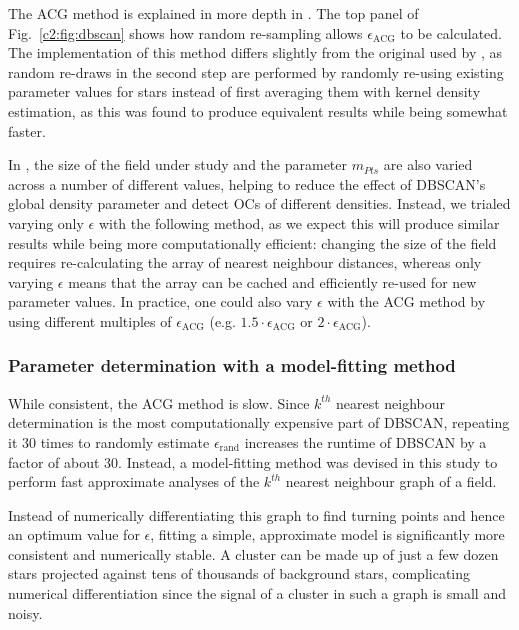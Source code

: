 The ACG method is explained in more depth in \cite{castro-ginard_new_2018}. The top panel of Fig.~\ref{c2:fig:dbscan} shows how random re-sampling allows $\epsilon_{\text{ACG}}$ to be calculated. The implementation of this method differs slightly from the original used by \cite{castro-ginard_new_2018}, as random re-draws in the second step are performed by randomly re-using existing parameter values for stars instead of first averaging them with kernel density estimation, as this was found to produce equivalent results while being somewhat faster.

In \cite{castro-ginard_new_2018, castro-ginard_hunting_2020}, the size of the field under study and the parameter $m_{Pts}$ are also varied across a number of different values, helping to reduce the effect of DBSCAN's global density parameter and detect OCs of different densities. Instead, we trialed varying only $\epsilon$ with the following method, as we expect this will produce similar results while being more computationally efficient: changing the size of the field requires re-calculating the array of nearest neighbour distances, whereas only varying $\epsilon$ means that the array can be cached and efficiently re-used for new parameter values. In practice, one could also vary $\epsilon$ with the ACG method by using different multiples of $\epsilon_{\text{ACG}}$ (e.g. $1.5 \cdot \epsilon_{\text{ACG}}$ or $2 \cdot \epsilon_{\text{ACG}}$).


\subsubsection{Parameter determination with a model-fitting method}

While consistent, the ACG method is slow. Since $k^{th}$ nearest neighbour determination is the most computationally expensive part of DBSCAN, repeating it 30 times to randomly estimate $\epsilon_{\text{rand}}$ increases the runtime of DBSCAN by a factor of about 30. Instead, a model-fitting method was devised in this study to perform fast approximate analyses of the $k^{th}$ nearest neighbour graph of a field.

Instead of numerically differentiating this graph to find turning points and hence an optimum value for $\epsilon$, fitting a simple, approximate model is significantly more consistent and numerically stable. A cluster can be made up of just a few dozen stars projected against tens of thousands of background stars, complicating numerical differentiation since the signal of a cluster in such a graph is small and noisy.


